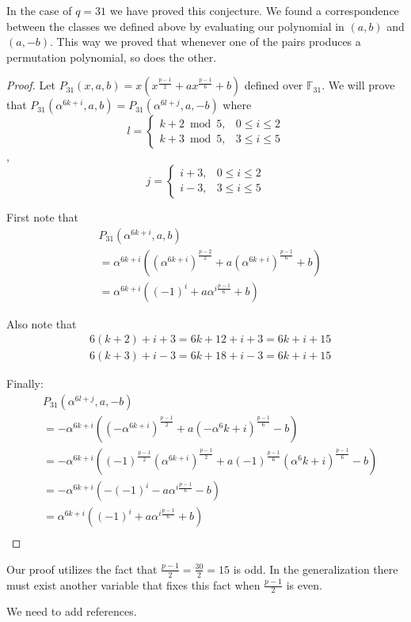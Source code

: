 \documentclass[12pt]{article}
\begin{document}
In the case of $q=31$ we have proved this conjecture. We found a correspondence between the classes we defined above by evaluating our polynomial in $(a,b)$ and $(a,-b)$. This way we proved that whenever one of the pairs produces a permutation polynomial, so does the other.


\begin{proof}
	Let $P_{31}(x,a,b) = x(x^{\frac{p-1}{2}}+ax^{\frac{p-1}{6}}+b)$ defined over $\mathbb{F}_{31}$. We will prove that $P_{31}(\alpha^{6k+i},a,b) = P_{31}(\alpha^{6l+j},a,-b)$ where
	$$
	l =
	\begin{cases}
	k+2 \bmod{5}, & 0 \leq i \leq 2 \\
	k+3 \bmod{5}, & 3 \leq i \leq 5
	\end{cases}
	$$
	,
	$$
	j =
	\begin{cases}
	i+3, & 0 \leq i \leq 2 \\
	i-3, & 3 \leq i \leq 5
	\end{cases}
	$$
	
	First note that
	\begin{align*}
	&P_{31}(\alpha^{6k+i},a,b) \\
	&=\alpha^{6k+i}((\alpha^{6k+i})^{\frac{p-2}{2}}+a(\alpha^{6k+i})^{\frac{p-1}{6}}+b) \\
	&=\alpha^{6k+i}((-1)^{i}+a\alpha^{i\frac{p-1}{6}}+b)
	\end{align*}

	Also note that
	\begin{align*}
	&6(k+2)+i+3=6k+12+i+3=6k+i+15 \\
	&6(k+3)+i-3=6k+18+i-3=6k+i+15
	\end{align*}

	Finally:
	\begin{align*}
	&P_{31}(\alpha^{6l+j},a,-b)	\\
	&= -\alpha^{6k+i}((-\alpha^{6k+i})^\frac{p-1}{2}+a(-\alpha^6k+i)^\frac{p-1}{6}-b) \\
	&= -\alpha^{6k+i}((-1)^{\frac{p-1}{2}}(\alpha^{6k+i})^\frac{p-1}{2}+a(-1)^{\frac{p-1}{6}}(\alpha^6k+i)^\frac{p-1}{6}-b) \\
	&= -\alpha^{6k+i}(-(-1)^{i}-a\alpha^{i\frac{p-1}{6}}-b) \\
	&= \alpha^{6k+i}((-1)^{i}+a\alpha^{i\frac{p-1}{6}}+b) \\
	\end{align*}
	
\end{proof}

Our proof utilizes the fact that $\frac{p-1}{2} = \frac{30}{2}=15$ is odd. In the generalization there must exist another variable that fixes this fact when $\frac{p-1}{2}$ is even.


\begin{thebibliography}{}

We need to add references.

\end{thebibliography}
\end{document}
